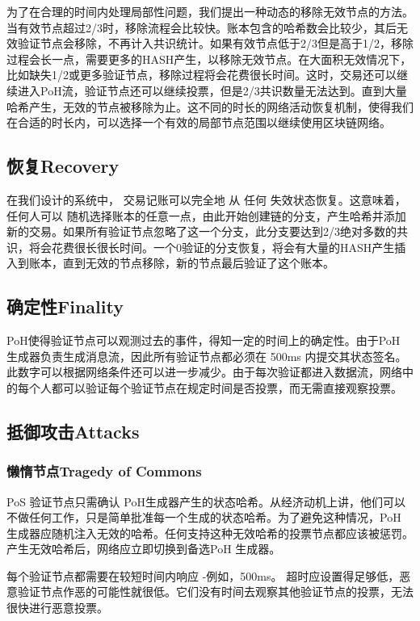 \documentclass[12pt, uft8]{ctexart}
\begin{document}
为了在合理的时间内处理局部性问题，我们提出一种动态的移除无效节点的方法。当有效节点超过2/3时，移除流程会比较快。账本包含的哈希数会比较少，其后无效验证节点会移除，不再计入共识统计。如果有效节点低于2/3但是高于1/2，移除过程会长一点，需要更多的HASH产生，以移除无效节点。在大面积无效情况下，比如缺失1/2或更多验证节点，移除过程将会花费很长时间。这时，交易还可以继续进入PoH流，验证节点还可以继续投票，但是2/3共识数量无法达到。直到大量哈希产生，无效的节点被移除为止。这不同的时长的网络活动恢复机制，使得我们在合适的时长内，可以选择一个有效的局部节点范围以继续使用区块链网络。

\subsection{恢复Recovery}\label{availability}
在我们设计的系统中， 交易记账可以完全地 从 任何 失效状态恢复。这意味着，任何人可以 随机选择账本的任意一点，由此开始创建链的分支，产生哈希并添加新的交易。如果所有验证节点忽略了这一个分支，此分支要达到2/3绝对多数的共识，将会花费很长很长时间。一个0验证的分支恢复，将会有大量的HASH产生插入到账本，直到无效的节点移除，新的节点最后验证了这个账本。 

\subsection{确定性Finality}\label{availability}
PoH使得验证节点可以观测过去的事件，得知一定的时间上的确定性。由于PoH 生成器负责生成消息流，因此所有验证节点都必须在 500ms 内提交其状态签名。此数字可以根据网络条件还可以进一步减少。由于每次验证都进入数据流，网络中的每个人都可以验证每个验证节点在规定时间是否投票，而无需直接观察投票。

\subsection{抵御攻击Attacks}
\subsubsection{懒惰节点Tragedy of Commons}
PoS 验证节点只需确认 PoH生成器产生的状态哈希。从经济动机上讲，他们可以不做任何工作，只是简单批准每一个生成的状态哈希。为了避免这种情况，PoH 生成器应随机注入无效的哈希。任何支持这种无效哈希的投票节点都应该被惩罚。产生无效哈希后，网络应立即切换到备选PoH 生成器。

每个验证节点都需要在较短时间内响应 -例如，500ms。 超时应设置得足够低，恶意验证节点作恶的可能性就很低。它们没有时间去观察其他验证节点的投票，无法很快进行恶意投票。
\end{document}
